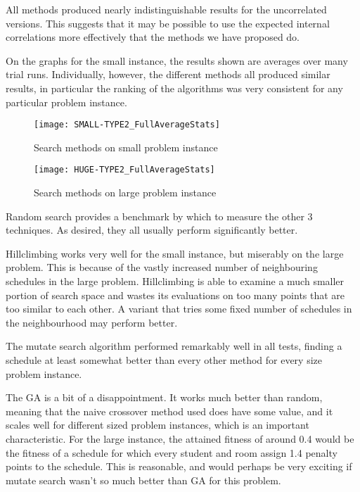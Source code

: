 \documentclass[letterpaper]{article}
\begin{document}
    All methods produced nearly indistinguishable results for the uncorrelated 
    versions. This suggests that it may be possible to use the expected internal 
    correlations more effectively that the methods we have proposed do.
    
    On the graphs for the small instance, the results shown are averages over many trial 
    runs. Individually, however, the different methods all produced similar results, in 
    particular the ranking of the algorithms was very consistent for any particular problem 
    instance.
    
    \begin{figure}[h]
  	  \centering
  	  \texttt{[image: SMALL-TYPE2\_FullAverageStats]}
      \caption{Search methods on small problem instance}
	\end{figure}
	
	\begin{figure}[h]
  	  \centering
  	  \texttt{[image: HUGE-TYPE2\_FullAverageStats]}
      \caption{Search methods on large problem instance}
	\end{figure}
	
	Random search provides a benchmark by which to measure the other 3 techniques. 
	As desired, they all usually perform significantly better.
	
	Hillclimbing works very well for the small instance, but miserably on the large 
	problem. This is because of the vastly increased number of neighbouring schedules 
	in the large problem. Hillclimbing is able to examine a much smaller portion of 
	search space and wastes its evaluations on too many points that are too similar 
	to each other. A variant that tries some fixed number of schedules in the 
	neighbourhood may perform better.
	
	The mutate search algorithm performed remarkably well in all tests, finding a 
	schedule at least somewhat better than every other method for every size problem 
	instance.
	
	The GA is a bit of a disappointment. It works much better than random, meaning 
	that the naive crossover method used does have some value, and it scales well 
	for different sized problem instances, which is an important characteristic. 
	For the large instance, the attained fitness of around 0.4 would be the fitness 
	of a schedule for which every student and room assign 1.4 penalty points to the 
	schedule. This is reasonable, and would perhaps be very exciting if mutate search 
	wasn't so much better than GA for this problem.
  
\end{document}
